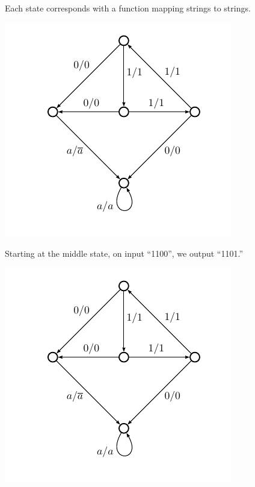 \documentclass{beamer}
\begin{document}
\begin{frame}
  Each state corresponds with a function mapping strings to strings.
  \begin{center}
    \includegraphics[scale=0.4]{../figures/grigorchuk}
  \end{center}
\end{frame}

\begin{frame}
  Starting at the middle state, on input ``1100'', we output ``1101.''
  \begin{center}
    \includegraphics[scale=0.4]{../figures/grigorchuk}
  \end{center}
\end{frame}
\end{document}
